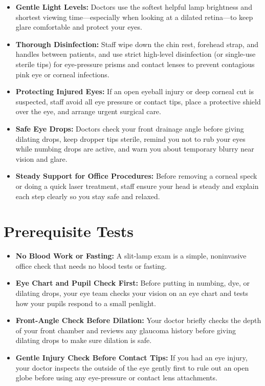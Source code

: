 \begin{itemize}
    \item \textbf{Gentle Light Levels:} Doctors use the softest helpful lamp brightness and shortest viewing time---especially when looking at a dilated retina---to keep glare comfortable and protect your eyes.
    \item \textbf{Thorough Disinfection:} Staff wipe down the chin rest, forehead strap, and handles between patients, and use strict high-level disinfection (or single-use sterile tips) for eye-pressure prisms and contact lenses to prevent contagious pink eye or corneal infections.
    \item \textbf{Protecting Injured Eyes:} If an open eyeball injury or deep corneal cut is suspected, staff avoid all eye pressure or contact tips, place a protective shield over the eye, and arrange urgent surgical care.
    \item \textbf{Safe Eye Drops:} Doctors check your front drainage angle before giving dilating drops, keep dropper tips sterile, remind you not to rub your eyes while numbing drops are active, and warn you about temporary blurry near vision and glare.
    \item \textbf{Steady Support for Office Procedures:} Before removing a corneal speck or doing a quick laser treatment, staff ensure your head is steady and explain each step clearly so you stay safe and relaxed.
\end{itemize}

\section{Prerequisite Tests}

\begin{itemize}
    \item \textbf{No Blood Work or Fasting:} A slit-lamp exam is a simple, noninvasive office check that needs no blood tests or fasting.
    \item \textbf{Eye Chart and Pupil Check First:} Before putting in numbing, dye, or dilating drops, your eye team checks your vision on an eye chart and tests how your pupils respond to a small penlight.
    \item \textbf{Front-Angle Check Before Dilation:} Your doctor briefly checks the depth of your front chamber and reviews any glaucoma history before giving dilating drops to make sure dilation is safe.
    \item \textbf{Gentle Injury Check Before Contact Tips:} If you had an eye injury, your doctor inspects the outside of the eye gently first to rule out an open globe before using any eye-pressure or contact lens attachments.
\end{itemize}

